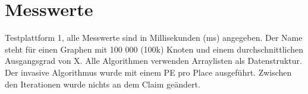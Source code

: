 

\appendix
{}


\section{Messwerte}
\label{Anhang-Messwerte}
Testplattform 1, alle Messwerte sind in Millisekunden (ms) angegeben. Der Name  steht für einen Graphen mit 100 000 (100k) Knoten und einem durchschnittlichen Ausgangsgrad von X. Alle Algorithmen verwenden Arraylisten als Datenstruktur. Der invasive Algorithmus wurde mit einem PE pro Place ausgeführt. Zwischen den Iterationen wurde nichts an dem Claim geändert.
 


		
